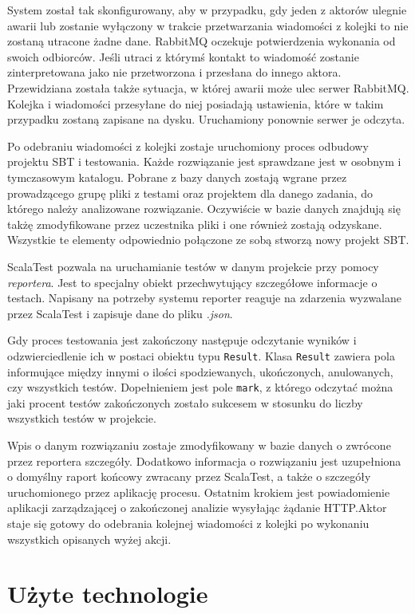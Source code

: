 \documentclass[brudnopis]{xmgr}
\begin{document}
System został tak skonfigurowany, aby w przypadku, gdy jeden z aktorów ulegnie awarii lub zostanie wyłączony w trakcie przetwarzania wiadomości z kolejki to nie zostaną utracone żadne dane. RabbitMQ oczekuje potwierdzenia wykonania od swoich odbiorców. Jeśli utraci z którymś kontakt to wiadomość zostanie zinterpretowana jako nie przetworzona i przesłana do innego aktora. Przewidziana została także sytuacja, w której awarii może ulec serwer RabbitMQ. Kolejka i wiadomości przesyłane do niej posiadają ustawienia, które w takim przypadku zostaną zapisane na dysku. Uruchamiony ponownie serwer je odczyta. 

Po odebraniu wiadomości z kolejki zostaje uruchomiony proces odbudowy projektu SBT i testowania. Każde rozwiązanie jest sprawdzane jest w osobnym i tymczasowym katalogu. Pobrane z bazy danych zostają wgrane przez prowadzącego grupę pliki z testami oraz projektem dla danego zadania, do którego należy analizowane rozwiązanie. Oczywiście w bazie danych znajdują się takżę zmodyfikowane przez uczestnika pliki i one również zostają odzyskane. Wszystkie te elementy odpowiednio połączone ze sobą stworzą nowy projekt SBT. 

ScalaTest pozwala na uruchamianie testów w danym projekcie przy pomocy \emph{reportera}. Jest to specjalny obiekt przechwytujący szczegółowe informacje o testach. Napisany na potrzeby systemu reporter reaguje na zdarzenia wyzwalane przez ScalaTest i zapisuje dane do pliku \emph{.json}. 

Gdy proces testowania jest zakończony następuje odczytanie wyników i odzwierciedlenie ich w postaci obiektu typu \texttt{Result}. Klasa \texttt{Result} zawiera pola informujące między innymi o ilości spodziewanych, ukończonych, anulowanych, czy wszystkich testów. Dopełnieniem jest pole \texttt{mark}, z którego odczytać można jaki procent testów zakończonych zostało sukcesem w stosunku do liczby wszystkich testów w projekcie. 

Wpis o danym rozwiązaniu zostaje zmodyfikowany w bazie danych o zwrócone przez reportera szczegóły. Dodatkowo informacja o rozwiązaniu jest uzupełniona o domyślny raport końcowy zwracany przez ScalaTest, a także o szczegóły uruchomionego przez aplikację procesu. Ostatnim krokiem jest powiadomienie aplikacji zarządzającej o zakończonej analizie wysyłając żądanie HTTP.Aktor staje się gotowy do odebrania kolejnej wiadomości z kolejki po wykonaniu wszystkich opisanych wyżej akcji.

\section{Użyte technologie}
\end{document}
